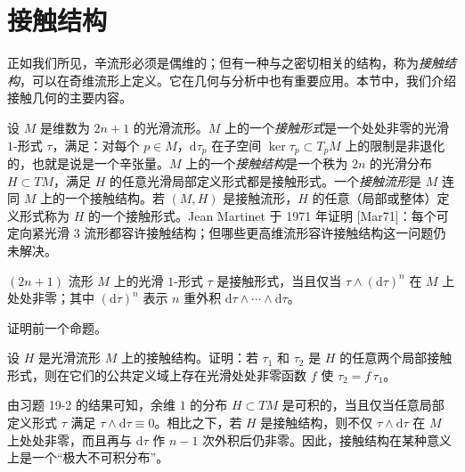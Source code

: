 \documentclass[../../main.tex]{subfiles}
\begin{document}
\section{接触结构}\label{section:ch22-contact-structures}

正如我们所见，辛流形必须是偶维的；但有一种与之密切相关的结构，称为\emph{接触结构}，可以在奇维流形上定义。它在几何与分析中也有重要应用。本节中，我们介绍接触几何的主要内容。

设 $M$ 是维数为 $2n+1$ 的光滑流形。$M$ 上的一个\emph{接触形式}是一个处处非零的光滑 $1$-形式 $\tau$，满足：对每个 $p\in M$，$\mathrm{d}\tau_p$ 在子空间 $\ker\tau_p\subset T_pM$ 上的限制是非退化的，也就是说是一个辛张量。$M$ 上的一个\emph{接触结构}是一个秩为 $2n$ 的光滑分布 $H\subset TM$，满足 $H$ 的任意光滑局部定义形式都是接触形式。一个\emph{接触流形}是 $M$ 连同 $M$ 上的一个接触结构。若 $(M,H)$ 是接触流形，$H$ 的任意（局部或整体）定义形式称为 $H$ 的一个接触形式。Jean Martinet 于 1971 年证明 [Mar71]：每个可定向紧光滑 $3$ 流形都容许接触结构；但哪些更高维流形容许接触结构这一问题仍未解决。

\begin{proposition}\label{proposition:ch22-contact-form-criterion}
$(2n+1)$ 流形 $M$ 上的光滑 $1$-形式 $\tau$ 是接触形式，当且仅当 $\tau\wedge(\mathrm{d}\tau)^n$ 在 $M$ 上处处非零；其中 $(\mathrm{d}\tau)^n$ 表示 $n$ 重外积 $\mathrm{d}\tau\wedge\cdots\wedge\mathrm{d}\tau$。
\end{proposition}

\begin{exercise}\label{exercise:ch22-25}
证明前一个命题。
\end{exercise}

\begin{exercise}\label{exercise:ch22-26}
设 $H$ 是光滑流形 $M$ 上的接触结构。证明：若 $\tau_1$ 和 $\tau_2$ 是 $H$ 的任意两个局部接触形式，则在它们的公共定义域上存在光滑处处非零函数 $f$ 使 $\tau_2=f\,\tau_1$。
\end{exercise}

由习题 19-2 的结果可知，余维 $1$ 的分布 $H\subset TM$ 是可积的，当且仅当任意局部定义形式 $\tau$ 满足 $\tau\wedge\mathrm{d}\tau\equiv0$。相比之下，若 $H$ 是接触结构，则不仅 $\tau\wedge\mathrm{d}\tau$ 在 $M$ 上处处非零，而且再与 $\mathrm{d}\tau$ 作 $n-1$ 次外积后仍非零。因此，接触结构在某种意义上是一个“极大不可积分布”。
\end{document}
